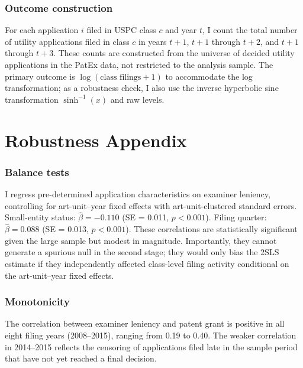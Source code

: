 \documentclass[12pt]{article}
\begin{document}
\subsubsection*{Outcome construction} For each application $i$ filed in USPC class $c$ and year $t$, I count the total number of utility applications filed in class $c$ in years $t+1$, $t+1$ through $t+2$, and $t+1$ through $t+3$. These counts are constructed from the universe of decided utility applications in the PatEx data, not restricted to the analysis sample. The primary outcome is $\log(\text{class filings} + 1)$ to accommodate the log transformation; as a robustness check, I also use the inverse hyperbolic sine transformation $\sinh^{-1}(x)$ and raw levels.


\section{Robustness Appendix}

\subsubsection*{Balance tests} I regress pre-determined application characteristics on examiner leniency, controlling for art-unit--year fixed effects with art-unit-clustered standard errors. Small-entity status: $\hat{\beta} = -0.110$ (SE = 0.011, $p < 0.001$). Filing quarter: $\hat{\beta} = 0.088$ (SE = 0.013, $p < 0.001$). These correlations are statistically significant given the large sample but modest in magnitude. Importantly, they cannot generate a spurious null in the second stage; they would only bias the 2SLS estimate if they independently affected class-level filing activity conditional on the art-unit--year fixed effects.

\subsubsection*{Monotonicity} The correlation between examiner leniency and patent grant is positive in all eight filing years (2008--2015), ranging from 0.19 to 0.40. The weaker correlation in 2014--2015 reflects the censoring of applications filed late in the sample period that have not yet reached a final decision.
\end{document}
